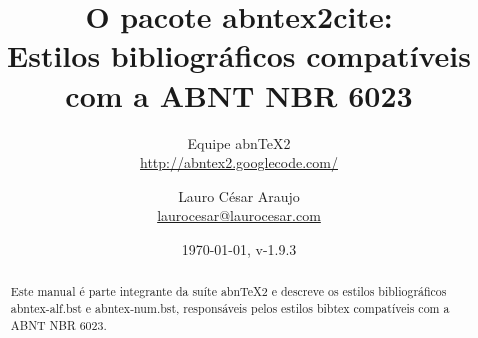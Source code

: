 \documentclass[a4paper]{ltxdoc}
\begin{document}
\nocite{tourinho1994,silva1996,rego1991,marques1993,tamandare1993}
\nocite{cesar1994,azevedo1994,batista1992,chueire1994}
\nocite{duran1993,chemello1993}
\nocite{arbex1993,carvalho1994,miglori1993,amaral1994,rodrigues1994}
\nocite{carruth1993,saadi1994,mandino1994}
\nocite{makau1962,lion1981}
\nocite{morgado1990,araujo1986}
\nocite{morgadob1990}
\nocite{morgadoc1990}
\nocite{laurenti1978,marins1991,malagrino1985,zilberman1998,holanda1994,pelosi1993,tringali1994,delosmar1997,resprinb1997,cardim1984}
\nocite{cretella1992,boletime1965}
\nocite{freyre1943,freyre1936}
\nocite{freyreg1936,freyre1938}
\nocite{DOI}
\nocite{hamada2008}

\nocite{ABNT-final}

\newcommand{\titulo}{\textbf{O pacote \textsf{abntex2cite}}:\\
\Large{Estilos bibliográficos compatíveis com a ABNT NBR 6023}}
\newcommand{\abnTeX}{abn\TeX}
\newcommand{\abnTeXSite}{\url{http://abntex2.googlecode.com/}}
\newcommand{\optiondefaultval}[1]{\underline{\texttt{#1}}}

\title{\titulo}
\author{Equipe \abnTeX2\\\abnTeXSite 
\and 
Lauro César Araujo\\\url{laurocesar@laurocesar.com}}
\date{\today, v-1.9.3}


% 

\maketitle

\begin{abstract}
Este manual é parte integrante da suíte \abnTeX2 e descreve os estilos
bibliográficos \textsf{abntex-alf.bst} e \textsf{abntex-num.bst}, responsáveis
pelos estilos \textsf{bibtex} compatíveis com a ABNT NBR 6023.
\end{abstract}
\end{document}
